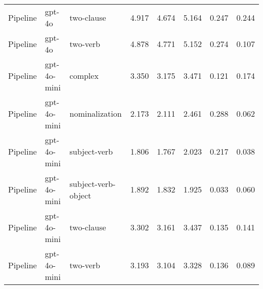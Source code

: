 \begin{table}
\begin{tabular}{lllrrrrr}
Pipeline & gpt-4o & two-clause & 4.917 & 4.674 & 5.164 & 0.247 & 0.244 \\
Pipeline & gpt-4o & two-verb & 4.878 & 4.771 & 5.152 & 0.274 & 0.107 \\
Pipeline & gpt-4o-mini & complex & 3.350 & 3.175 & 3.471 & 0.121 & 0.174 \\
Pipeline & gpt-4o-mini & nominalization & 2.173 & 2.111 & 2.461 & 0.288 & 0.062 \\
Pipeline & gpt-4o-mini & subject-verb & 1.806 & 1.767 & 2.023 & 0.217 & 0.038 \\
Pipeline & gpt-4o-mini & subject-verb-object & 1.892 & 1.832 & 1.925 & 0.033 & 0.060 \\
Pipeline & gpt-4o-mini & two-clause & 3.302 & 3.161 & 3.437 & 0.135 & 0.141 \\
Pipeline & gpt-4o-mini & two-verb & 3.193 & 3.104 & 3.328 & 0.136 & 0.089 \\
\bottomrule
\end{tabular}
\end{table}
